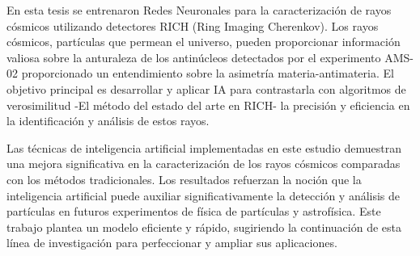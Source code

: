 


\begin{abstracts}        %

En esta tesis se entrenaron Redes Neuronales para la caracterización de rayos cósmicos utilizando detectores RICH (Ring Imaging Cherenkov). Los rayos cósmicos, partículas que permean el universo, pueden proporcionar información valiosa sobre la anturaleza de los antinúcleos detectados por el experimento AMS-02 proporcionado un entendimiento sobre la asimetría materia-antimateria. El objetivo principal es desarrollar y aplicar IA para contrastarla con algoritmos de verosimilitud -El método del estado del arte en RICH-  la precisión y eficiencia en la identificación y análisis de estos rayos.

Las técnicas de inteligencia artificial implementadas en este estudio demuestran una mejora significativa en la caracterización de los rayos cósmicos comparadas con los métodos tradicionales. Los resultados refuerzan la noción que la inteligencia artificial puede auxiliar significativamente la detección y análisis de partículas en futuros experimentos de física de partículas y astrofísica. Este trabajo plantea  un modelo eficiente y rápido, sugiriendo la continuación de esta línea de investigación para perfeccionar y ampliar sus aplicaciones.



\end{abstracts}


